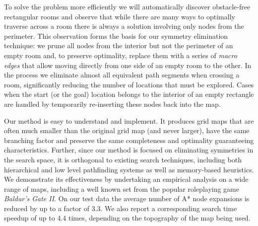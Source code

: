 To solve the problem more efficiently we will automatically discover obstacle-free rectangular rooms and 
observe that while there are many ways to optimally traverse across a room there is always a solution 
involving only nodes from the perimeter.
This observation forms the basis for our symmetry elimination technique: we prune all nodes from the interior
but not the perimeter of an empty room and, to preserve optimality,
replace them with a series of \emph{macro edges} that allow
moving directly from one side of an empty room to the other. 
In the process we eliminate almost all equivalent path segments when crossing a room,
significantly reducing the number of locations that must be explored.
Cases when the start (or the goal) location belongs to the interior of an empty rectangle are handled by
temporarily re-inserting these nodes back into the map.
\par
Our method is easy to understand and implement.
It produces grid maps that are often much smaller than the original grid map
(and never larger), have the same branching factor and preserve the same completeness and optimality 
guaranteeing characteristics.
Further, since our method is focused on eliminating symmetries in the search space, it is orthogonal to existing 
search techniques, including both hierarchical and low level pathfinding systems as well as memory-based heuristics.
We demonstrate its effectiveness by undertaking an empirical analysis on a wide range of maps, 
including a well known set from the popular roleplaying game \emph{Baldur's Gate II}. 
On our test data the average number of A* node expansions is reduced by up to a
factor of 3.3.
We also report a corresponding search time speedup of up to 4.4 times, depending on the 
topography of the map being used.



